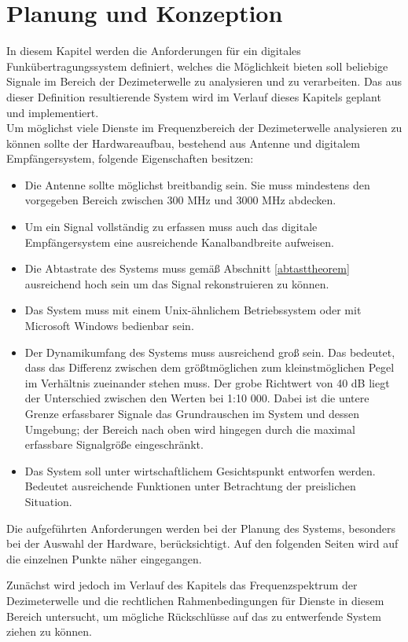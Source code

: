 \chapter{Planung und Konzeption}
In diesem Kapitel werden die Anforderungen für ein digitales Funkübertragungssystem definiert, welches die Möglichkeit bieten soll beliebige Signale im Bereich der Dezimeterwelle zu analysieren und zu verarbeiten. Das aus dieser Definition resultierende System wird im Verlauf dieses Kapitels geplant und implementiert.\\
Um möglichst viele Dienste im Frequenzbereich der Dezimeterwelle analysieren zu können sollte der Hardwareaufbau, bestehend aus Antenne und digitalem Empfängersystem, folgende Eigenschaften besitzen:
\begin{itemize}
	\item Die Antenne sollte möglichst breitbandig sein. Sie muss mindestens den vorgegeben Bereich zwischen 300 MHz und 3000 MHz abdecken.
	\item Um ein Signal vollständig zu erfassen muss auch das digitale Empfängersystem eine ausreichende Kanalbandbreite aufweisen.
	\item Die Abtastrate des Systems muss gemäß Abschnitt \ref{abtasttheorem} ausreichend hoch sein um das Signal rekonstruieren zu können.
	\item Das System muss mit einem Unix-ähnlichem Betriebssystem oder mit Microsoft Windows bedienbar sein.
	\item Der Dynamikumfang des Systems muss ausreichend groß sein. Das bedeutet, dass das Differenz zwischen dem größtmöglichen zum kleinstmöglichen Pegel im Verhältnis zueinander stehen muss. Der grobe Richtwert von 40 dB liegt der Unterschied zwischen den Werten bei 1:10 000. Dabei ist die untere Grenze erfassbarer Signale das Grundrauschen im System und dessen Umgebung; der Bereich nach oben wird hingegen durch die maximal erfassbare Signalgröße eingeschränkt.
	\item Das System soll unter wirtschaftlichem Gesichtspunkt entworfen werden. Bedeutet ausreichende Funktionen unter Betrachtung der preislichen Situation.
\end{itemize}

Die aufgeführten Anforderungen werden bei der Planung des Systems, besonders bei der Auswahl der Hardware, berücksichtigt. Auf den folgenden Seiten wird auf die einzelnen Punkte näher eingegangen. 

Zunächst wird jedoch im Verlauf des Kapitels das Frequenzspektrum der Dezimeterwelle und die rechtlichen Rahmenbedingungen für Dienste in diesem Bereich untersucht, um mögliche Rückschlüsse auf das zu entwerfende System ziehen zu können.



